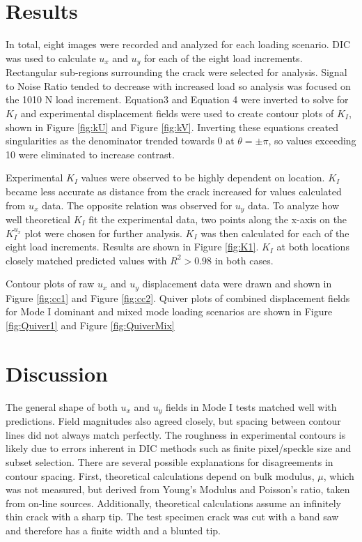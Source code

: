 \documentclass[12pt]{article}
\begin{document}
\section{Results}%
In total, eight images were recorded and analyzed for each loading scenario. DIC was used to calculate $u_x$ and $u_y$ for each of the eight load increments. Rectangular sub-regions surrounding the crack were selected for analysis. Signal to Noise Ratio tended to decrease with increased load so analysis was focused on the 1010 N load increment. Equation3 and Equation 4 were inverted to solve for $K_I$ and experimental displacement fields were used to create contour plots of $K_I$, shown in Figure \ref{fig:kU} and Figure \ref{fig:kV}. Inverting these equations created singularities as the denominator trended towards 0 at $\theta = \pm \pi$, so values exceeding 10 were eliminated to increase contrast. 


Experimental $K_I$ values were observed to be highly dependent on location. $K_I$ became less accurate as distance from the crack increased for values calculated from $u_x$ data. The opposite relation was observed for $u_y$ data. To analyze how well theoretical $K_I$ fit the experimental data, two points along the x-axis on the $K_I^{u_x}$ plot were chosen for further analysis. $K_I$ was then calculated for each of the eight load increments. Results are shown in Figure \ref{fig:K1}. $K_I$ at both locations closely matched predicted values with $R^2>0.98$ in both cases. 


Contour plots of raw $u_x$ and $u_y$ displacement data were drawn and shown in Figure \ref{fig:cc1} and Figure \ref{fig:cc2}. Quiver plots of combined displacement fields for Mode I dominant and mixed mode loading scenarios are shown in Figure \ref{fig:Quiver1} and Figure \ref{fig:QuiverMix}



\section{Discussion}%
The general shape of both $u_x$ and $u_y$ fields in Mode I tests matched well with predictions. Field magnitudes also agreed closely, but spacing between contour lines did not always match perfectly. The roughness in experimental contours is likely due to errors inherent in DIC methods such as finite pixel/speckle size and subset selection. There are several possible explanations for disagreements in contour spacing. First, theoretical calculations depend on bulk modulus, $\mu$, which was not measured, but derived from Young's Modulus and Poisson's ratio, taken from on-line sources. Additionally, theoretical calculations assume an infinitely thin crack with a sharp tip. The test specimen crack was cut with a band saw and therefore has a finite width and a blunted tip. 
\end{document}
